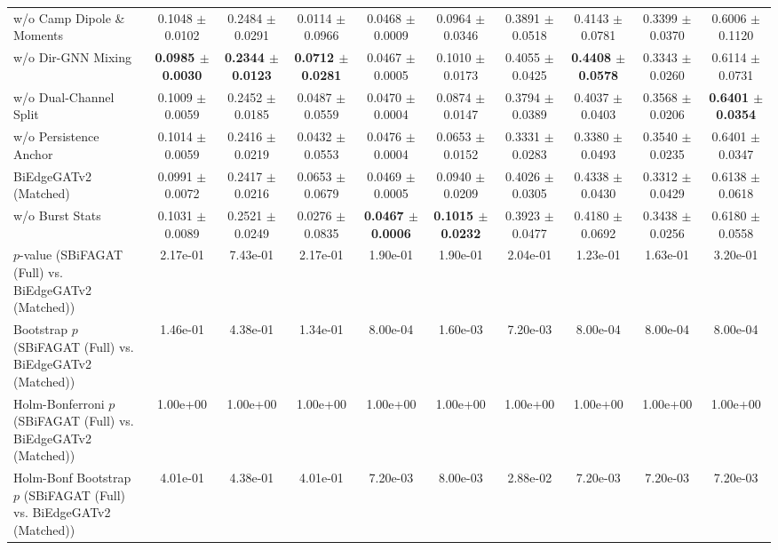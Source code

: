 \begin{table}[t]
{\begin{tabular}{lccccccccc}
w/o Camp Dipole \& Moments & 0.1048 $\pm$ 0.0102 & 0.2484 $\pm$ 0.0291 & 0.0114 $\pm$ 0.0966 & 0.0468 $\pm$ 0.0009 & 0.0964 $\pm$ 0.0346 & 0.3891 $\pm$ 0.0518 & 0.4143 $\pm$ 0.0781 & 0.3399 $\pm$ 0.0370 & 0.6006 $\pm$ 0.1120 \\
w/o Dir-GNN Mixing & \textbf{0.0985 $\pm$ 0.0030} & \textbf{0.2344 $\pm$ 0.0123} & \textbf{0.0712 $\pm$ 0.0281} & 0.0467 $\pm$ 0.0005 & 0.1010 $\pm$ 0.0173 & 0.4055 $\pm$ 0.0425 & \textbf{0.4408 $\pm$ 0.0578} & 0.3343 $\pm$ 0.0260 & 0.6114 $\pm$ 0.0731 \\
w/o Dual-Channel Split & 0.1009 $\pm$ 0.0059 & 0.2452 $\pm$ 0.0185 & 0.0487 $\pm$ 0.0559 & 0.0470 $\pm$ 0.0004 & 0.0874 $\pm$ 0.0147 & 0.3794 $\pm$ 0.0389 & 0.4037 $\pm$ 0.0403 & 0.3568 $\pm$ 0.0206 & \textbf{0.6401 $\pm$ 0.0354} \\
w/o Persistence Anchor & 0.1014 $\pm$ 0.0059 & 0.2416 $\pm$ 0.0219 & 0.0432 $\pm$ 0.0553 & 0.0476 $\pm$ 0.0004 & 0.0653 $\pm$ 0.0152 & 0.3331 $\pm$ 0.0283 & 0.3380 $\pm$ 0.0493 & 0.3540 $\pm$ 0.0235 & 0.6401 $\pm$ 0.0347 \\
BiEdgeGATv2 (Matched) & 0.0991 $\pm$ 0.0072 & 0.2417 $\pm$ 0.0216 & 0.0653 $\pm$ 0.0679 & 0.0469 $\pm$ 0.0005 & 0.0940 $\pm$ 0.0209 & 0.4026 $\pm$ 0.0305 & 0.4338 $\pm$ 0.0430 & 0.3312 $\pm$ 0.0429 & 0.6138 $\pm$ 0.0618 \\
w/o Burst Stats & 0.1031 $\pm$ 0.0089 & 0.2521 $\pm$ 0.0249 & 0.0276 $\pm$ 0.0835 & \textbf{0.0467 $\pm$ 0.0006} & \textbf{0.1015 $\pm$ 0.0232} & 0.3923 $\pm$ 0.0477 & 0.4180 $\pm$ 0.0692 & 0.3438 $\pm$ 0.0256 & 0.6180 $\pm$ 0.0558 \\
\midrule
$p$-value (SBiFAGAT (Full) vs. BiEdgeGATv2 (Matched)) & 2.17e-01 & 7.43e-01 & 2.17e-01 & 1.90e-01 & 1.90e-01 & 2.04e-01 & 1.23e-01 & 1.63e-01 & 3.20e-01 \\
Bootstrap $p$ (SBiFAGAT (Full) vs. BiEdgeGATv2 (Matched)) & 1.46e-01 & 4.38e-01 & 1.34e-01 & 8.00e-04 & 1.60e-03 & 7.20e-03 & 8.00e-04 & 8.00e-04 & 8.00e-04 \\
Holm-Bonferroni $p$ (SBiFAGAT (Full) vs. BiEdgeGATv2 (Matched)) & 1.00e+00 & 1.00e+00 & 1.00e+00 & 1.00e+00 & 1.00e+00 & 1.00e+00 & 1.00e+00 & 1.00e+00 & 1.00e+00 \\
Holm-Bonf Bootstrap $p$ (SBiFAGAT (Full) vs. BiEdgeGATv2 (Matched)) & 4.01e-01 & 4.38e-01 & 4.01e-01 & 7.20e-03 & 8.00e-03 & 2.88e-02 & 7.20e-03 & 7.20e-03 & 7.20e-03 \\
\bottomrule
\end{tabular}
}
\end{table}
